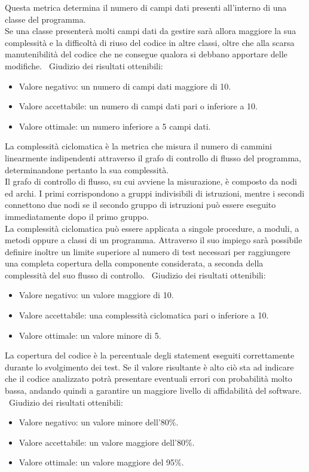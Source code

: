 \documentclass[a4paper, titlepage]{article}
\begin{document}
Questa metrica determina il numero di campi dati presenti all'interno di una classe del programma. \\ Se una classe presenterà molti campi dati da gestire sarà allora maggiore la sua complessità e la difficoltà di riuso del codice in altre classi, oltre che alla scarsa manutenibilità del codice che ne consegue qualora si debbano apportare delle modifiche.
\
\newline Giudizio dei risultati ottenibili:
\begin{itemize}
\item Valore negativo: un numero di campi dati maggiore di 10. 
\item Valore accettabile: un numero di campi dati pari o inferiore a 10.
\item Valore ottimale: un numero inferiore a 5 campi dati.
\end{itemize}

La complessità ciclomatica è la metrica che misura il numero di cammini linearmente indipendenti attraverso il grafo di controllo di flusso del programma, determinandone pertanto la sua complessità.
\\Il grafo di controllo di flusso, su cui avviene la misurazione, è composto da nodi ed archi. I primi corrispondono a gruppi indivisibili di istruzioni, mentre i secondi connettono due nodi se il secondo gruppo di istruzioni può essere eseguito immediatamente dopo il primo gruppo.
\\La complessità ciclomatica può essere
applicata a singole procedure, a moduli, a metodi oppure a classi di un programma.
Attraverso il suo impiego sarà possibile definire inoltre un limite superiore al numero di test necessari per raggiungere una completa copertura della componente considerata, a seconda della complessità del suo flusso di controllo.
\
\newline Giudizio dei risultati ottenibili:
\begin{itemize}
\item Valore negativo: un valore maggiore di 10. 
\item Valore accettabile: una complessità ciclomatica pari o inferiore a 10.
\item Valore ottimale: un valore minore di 5.
\end{itemize}

La copertura del codice è la percentuale degli statement eseguiti correttamente durante lo
svolgimento dei test. Se il valore risultante è alto ciò sta ad indicare che il codice analizzato potrà presentare eventuali errori con probabilità molto bassa, andando quindi a garantire un maggiore livello di affidabilità del software.
\
\newline Giudizio dei risultati ottenibili:
\begin{itemize}
\item Valore negativo: un valore minore dell'80\%. 
\item Valore accettabile: un valore maggiore dell'80\%.
\item Valore ottimale: un valore maggiore del 95\%.
\end{itemize}
\end{document}
